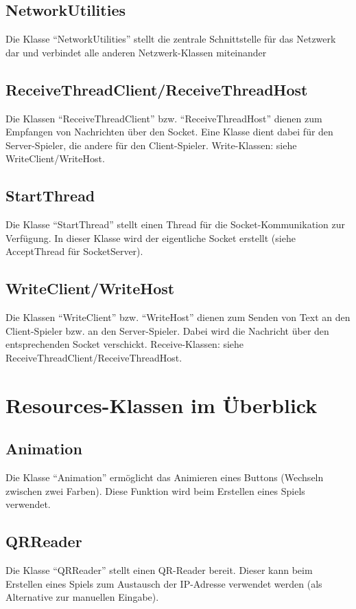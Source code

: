 \documentclass[11pt]{article} %
\begin{document}
\subsection{NetworkUtilities}
Die Klasse \enquote{NetworkUtilities} stellt die zentrale Schnittstelle für das Netzwerk dar und verbindet alle anderen Netzwerk-Klassen miteinander 

\subsection{ReceiveThreadClient/ReceiveThreadHost}
Die Klassen \enquote{ReceiveThreadClient} bzw. \enquote{ReceiveThreadHost} dienen zum Empfangen von Nachrichten über den Socket. Eine Klasse dient dabei für den Server-Spieler, die andere für den Client-Spieler. Write-Klassen: siehe WriteClient/WriteHost. 

\subsection{StartThread}
Die Klasse \enquote{StartThread} stellt einen Thread für die Socket-Kommunikation zur Verfügung. In dieser Klasse wird der eigentliche Socket erstellt (siehe AcceptThread für SocketServer).

\subsection{WriteClient/WriteHost}
Die Klassen \enquote{WriteClient} bzw. \enquote{WriteHost} dienen zum Senden von Text an den Client-Spieler bzw. an den Server-Spieler. Dabei wird die Nachricht über den entsprechenden Socket verschickt. Receive-Klassen: siehe ReceiveThreadClient/ReceiveThreadHost.

\section{Resources-Klassen im Überblick}
\subsection{Animation}
Die Klasse \enquote{Animation} ermöglicht das Animieren eines Buttons (Wechseln zwischen zwei Farben). Diese Funktion wird beim Erstellen eines Spiels verwendet.

\subsection{QRReader}
Die Klasse \enquote{QRReader} stellt einen QR-Reader bereit. Dieser kann beim Erstellen eines Spiels zum Austausch der IP-Adresse verwendet werden (als Alternative zur manuellen Eingabe).
\end{document}
